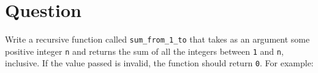 \newpage

\section{Question}

Write a recursive function called \texttt{sum_from_1_to} that takes as
an argument some positive integer \texttt{n} and returns the sum of
all the integers between \texttt{1} and \texttt{n},
inclusive.  If the value passed is invalid, the function should return
\texttt{0}.  For example:



\newpage

